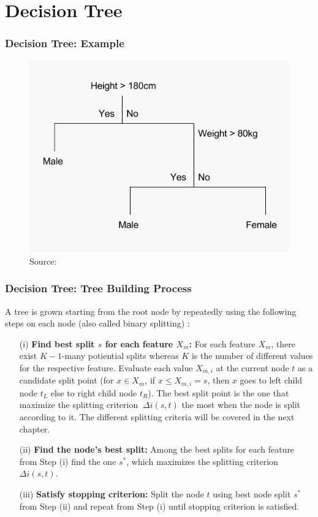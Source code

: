 \section{Decision Tree}

\begin{frame}
	\frametitle{Decision Tree: Example}
	\begin{figure}		
		\includegraphics[height=0.7\textheight]{images/decision_tree_example.png}
		\caption{Source:\cite{james2013learning} }
	\end{figure}
\end{frame}

\begin{frame}
	\frametitle{Decision Tree: Tree Building Process}
	A tree is grown starting from the root node by repeatedly 
	using the following steps on each node (also called binary splitting) \cite{breiman1984classification}:
	\begin{enumerate}
		\item[(i)] \textbf{Find best split \(s\) for each feature \(X_{m}\):}
		For each feature \(X_{m}\), there exist \(K-1\)-many potiential splits whereas \(K\) is the number of different values for the respective feature.
		Evaluate each value \(X_{m,i}\) at the current node \(t\) as a candidate split point (for \(x \in X_{m}\), if \(x \leq X_{m,i}=s\),
		then \(x\) goes to left child node \(t_{L}\) else to right child node \(t_{R}\)).
		The best split point is the one that maximize the splitting criterion \(\ \Delta i(s,t) \) the most when the node is split according to it.
		The different splitting criteria will be covered in the next chapter.
		\item[(ii)] \textbf{Find the node’s best split:} Among the best splits for each feature from Step (i) find the one \(s^{*}\), which maximizes the splitting criterion \(\Delta i(s,t)\).
		\item[(iii)] \textbf{Satisfy stopping criterion:} Split the node \(t\) using best node split \(s^{*}\) from Step (ii) and 
		repeat from Step (i) until stopping criterion is satisfied. 
	\end{enumerate}
\end{frame}	

